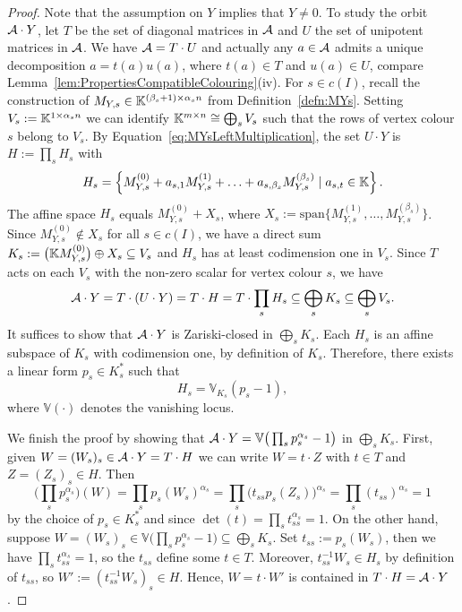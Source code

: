 \begin{proof}
	Note that the assumption on $Y$ implies that $Y \neq 0$.
	To study the orbit $\mathcal{A} \cdot Y$, let $T$ be the set of diagonal matrices in $\mathcal{A}$ and $U$ the set of unipotent matrices in $\mathcal{A}$. We have $\mathcal{A} = T \cdot U$ and actually any $a \in \mathcal{A}$ admits a unique decomposition $a = t(a)u(a)$, where $t(a) \in T$ and $u(a) \in U$, compare Lemma~\ref{lem:PropertiesCompatibleColouring}(iv).
	For $s \in c(I)$, recall the construction of $M_{Y,s} \in \mathbb K^{(\beta_s + 1)\times \alpha_s n}$ from Definition~\ref{defn:MYs}. Setting $V_s := \mathbb K^{1 \times \alpha_s n}$ we can identify $\mathbb K^{m \times n} \cong \bigoplus_s V_s$ such that the rows of vertex colour $s$ belong to $V_s$.
	By Equation~\eqref{eq:MYsLeftMultiplication}, the set $U \cdot Y$ is $H := \prod_s H_s$ with
	\begin{align*}
		H_s = \left\lbrace M_{Y,s}^{(0)} + a_{s,1} M_{Y,s}^{(1)} + \ldots + a_{s,\beta_s} M_{Y,s}^{(\beta_s)} \mid a_{s,t} \in \mathbb K \right\rbrace.
	\end{align*}
	The affine space $H_s$ equals $M_{Y,s}^{(0)} + X_s$, where $X_s := \mathrm{span} \big\lbrace M_{Y,s}^{(1)},\ldots, M_{Y,s}^{(\beta_s)} \big\rbrace$. Since $M_{Y,s}^{(0)} \notin X_s$ for all $s \in c(I)$,  we have a direct sum $K_s := \big( \mathbb K M_{Y,s}^{(0)} \big) \oplus X_s \subseteq V_s$ and $H_s$ has at least codimension one in $V_s$.
	Since $T$ acts on each $V_s$ with the non-zero scalar for vertex colour $s$, we have
	\begin{align*}
		\mathcal{A} \cdot Y = T \cdot (U \cdot Y) = T \cdot H = T \cdot \prod_s H_s
		\subseteq \bigoplus_s K_s \subseteq \bigoplus_s V_s.
	\end{align*}
	It suffices to show that $\mathcal{A} \cdot Y$ is Zariski-closed in $\bigoplus_s K_s$. Each $H_s$ is an affine subspace of $K_s$ with codimension one, by definition of $K_s$. Therefore, there exists a linear form $p_s \in K_s^*$ such that
		\[ H_s = \mathbb{V}_{K_s}(p_s - 1) , \]
	where $\mathbb{V}(\cdot)$ denotes the vanishing locus.
	
	We finish the proof by showing that $\mathcal{A} \cdot Y = \mathbb{V} \big( \prod_s p_s^{\alpha_s} - 1 \big)$ in $\bigoplus_{s} K_s$.
	First, given $W = (W_s)_s \in \mathcal{A} \cdot Y = T \cdot H$ we can write $W = t \cdot Z$ with $t \in T$ and $Z = (Z_s)_s \in H$. Then
	\[ \Big(\prod_s p_s^{\alpha_s} \Big)(W) = \prod_s p_s(W_s)^{\alpha_s}
	= \prod_s \big(t_{ss} p_s(Z_s) \big)^{\alpha_s} = \prod_s (t_{ss})^{\alpha_s} = 1 \]
	by the choice of $p_s \in K_s^*$ and since $\det(t) = \prod_s t_{ss}^{\alpha_s} = 1$. On the other hand, suppose $W = (W_s)_s \in \mathbb{V} \big( \prod_s p_s^{\alpha_s} - 1 \big) \subseteq \bigoplus_{s} K_s$. Set $t_{ss} := p_s(W_s)$, then we have $\prod_s t_{ss}^{\alpha_s} = 1$, so the $t_{ss}$ define some $t \in T$.
	Moreover, $t^{-1}_{ss} W_s \in H_s$ by definition of $t_{ss}$, so $W' := (t^{-1}_{ss} W_s)_s \in H$. Hence, $W = t \cdot W'$ is contained in $T \cdot H = \mathcal{A} \cdot Y$.
\end{proof}

